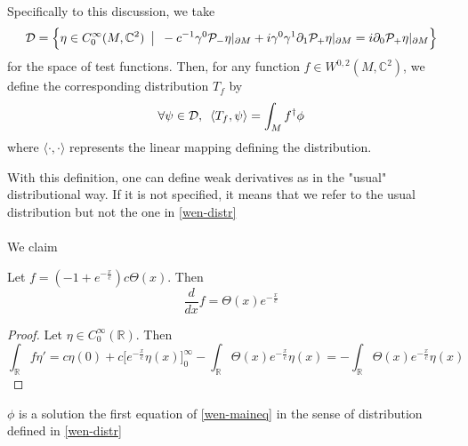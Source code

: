 \begin{definition}\label{wen-distr}
Specifically to this discussion, 
we take
\begin{equation*}
\mathcal{D} = \Big\{\eta \in C^{\infty}_0(M, \mathbb{C}^2) \enskip\big\vert \enskip -c^{-1}\gamma^0\mathcal{P}_-\eta\vert_{\partial M} + i\gamma^0\gamma^1\partial_1\mathcal{P}_+\eta\vert_{\partial M}= i\partial_0\mathcal{P}_+\eta\vert_{\partial M} \Big\}
\end{equation*}
for the space of test functions. 
Then, for any function $f \in W^{0,2}(M, \mathbb{C}^2)$, we define the corresponding distribution $T_f$ by
\begin{equation*}
\forall \psi\in \mathcal{D}, \enskip \langle T_f, \psi\rangle = \int_M f^\dagger \phi
\end{equation*}
where $\langle \cdot , \cdot \rangle$ represents the linear mapping defining the distribution.
\end{definition}
With this definition, one can define weak derivatives as in the "usual" distributional way. 
If it is not specified, it means that we refer to the usual distribution but not the one in \cref{wen-distr} \\\\
We claim
\begin{lemma}\label{wen-lem}
Let $f = (-1+ e^{-\frac{x}{c}})c\Theta(x)$. Then \begin{equation*}\frac{d}{d x} f = \Theta(x)e^{-\frac {x}{c}}\end{equation*}
\end{lemma}
\begin{proof}
Let $\eta\in C_0^\infty(\mathbb{R})$. Then
\begin{equation*}
\int_\mathbb{R} f \eta'  =   c\eta(0) + c\Big[ e^{-\frac{x}{c}} \eta(x) \Big]^\infty_0 - \int_\mathbb{R}\Theta(x)e^{-\frac{x}{c}}\eta(x) = -\int_\mathbb{R}\Theta(x)e^{-\frac{x}{c}}\eta(x)
\end{equation*}
\begin{equation*}
\end{equation*}
\end{proof}
\begin{proposition}
$\phi$ is a solution the first equation of \cref{wen-maineq} in the sense of distribution defined in \cref{wen-distr}\end{proposition}
